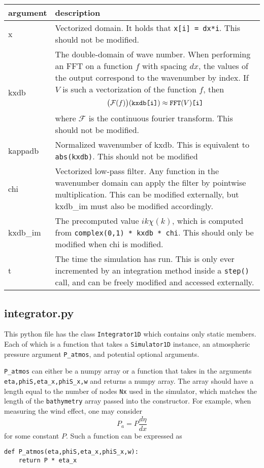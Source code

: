 \documentclass[10pt,a4paper]{article}
\newenvironment{arglist}
    {\begin{center}
    \begin{tabular}{l|p{12cm}}
    argument & description\\
    \hline
    }
    { 
    \end{tabular} 
    \end{center}
    }
\begin{document}
\begin{arglist}
x & Vectorized domain. It holds that \texttt{x[i] = dx*i}. This should not be modified.\\\hline

kxdb & The double-domain of wave number. When performing an FFT on a function $f$ with spacing $dx$, the values of the output correspond to the wavenumber by index. If $V$ is such a vectorization of the function $f$, then $$\big(\mathcal F(f)\big)(\text{\texttt{kxdb[i]}}) \approx \text{\texttt{FFT}}(V)\text{\texttt{[i]}}$$
where $\mathcal F$ is the continuous fourier transform. This should not be modified.\\\hline

kappadb & Normalized wavenumber of kxdb. This is equivalent to \texttt{abs(kxdb)}. This should not be modified\\\hline

chi & Vectorized low-pass filter. Any function in the wavenumber domain can apply the filter by pointwise multiplication. This can be modified externally, but kxdb\_im must also be modified accordingly.\\\hline

kxdb\_im & The precomputed value $ik \chi(k)$, which is computed from \texttt{complex(0,1) * kxdb * chi}. This should only be modified when chi is modified.\\\hline

t & The time the simulation has run. This is only ever incremented by an integration method inside a \texttt{step()} call, and can be freely modified and accessed externally.

\end{arglist}


\subsection{integrator.py}
This python file has the class \texttt{Integrator1D} which contains only static members. Each of which is a function that takes a \texttt{Simulator1D} instance, an atmospheric pressure argument \texttt{P\_atmos}, and potential optional arguments.

\texttt{P\_atmos} can either be a numpy array or a function that takes in the arguments \texttt{eta,phiS,eta\_x,phiS\_x,w} and returns a numpy array. The array should have a length equal to the number of nodes \texttt{Nx} used in the simulator, which matches the length of the \texttt{bathymetry} array passed into the constructor. For example, when measuring the wind effect, one may consider
$$P_a = P\frac{d\eta}{dx}$$
for some constant $P$. Such a function can be expressed as
\begin{verbatim}
def P_atmos(eta,phiS,eta_x,phiS_x,w):
    return P * eta_x
\end{verbatim}
\end{document}
